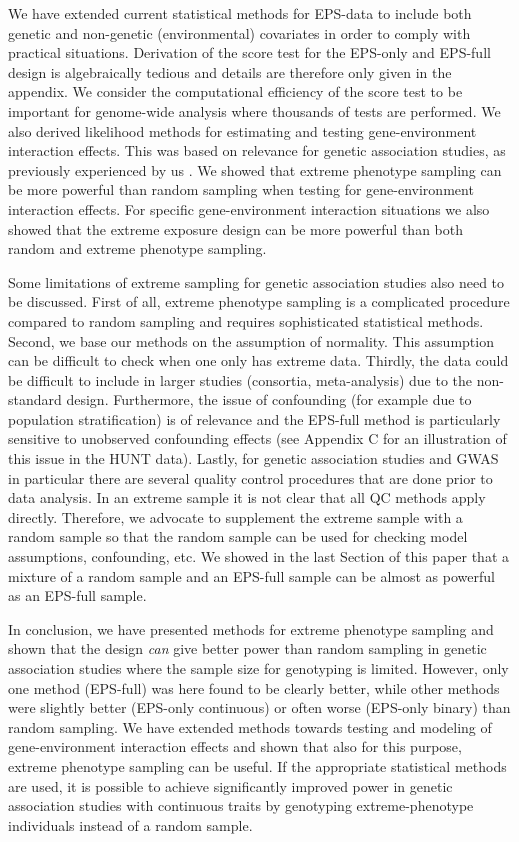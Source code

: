 \documentclass[10pt,a4paper]{article}
\begin{document}
We have extended current statistical methods for EPS-data to include both genetic and non-genetic (environmental) covariates in order to comply with practical situations. Derivation of the score test for the EPS-only and EPS-full design is algebraically tedious and details are therefore only given in the appendix. We consider the computational efficiency of the score test to be important for genome-wide analysis where thousands of tests are performed. We also derived likelihood methods for estimating and testing gene-environment interaction effects. This was based on relevance for genetic association studies, as previously experienced by us \citep{WHRbjornland}. We showed that extreme phenotype sampling can be more powerful than random sampling when testing for gene-environment interaction effects. For specific gene-environment interaction situations we also showed that the extreme exposure design can be more powerful than both random and extreme phenotype sampling.

Some limitations of extreme sampling for genetic association studies also need to be discussed. First of all, extreme phenotype sampling is a complicated procedure compared to random sampling and requires sophisticated statistical methods. Second, we base our methods on the assumption of normality. This assumption can be difficult to check when one only has extreme data. Thirdly, the data could be difficult to include in larger studies (consortia, meta-analysis) due to the non-standard design. Furthermore, the issue of confounding (for example due to population stratification) is of relevance and the EPS-full method is particularly sensitive to unobserved confounding effects (see Appendix C for an illustration of this issue in the HUNT data). Lastly, for genetic association studies and GWAS in particular there are several quality control procedures that are done prior to data analysis. In an extreme sample it is not clear that all QC methods apply directly. Therefore, we advocate to supplement the extreme sample with a random sample so that the random sample can be used for checking model assumptions, confounding, etc. We showed in the last Section of this paper that a mixture of a random sample and an EPS-full sample can be almost as powerful as an EPS-full sample.

In conclusion, we have presented methods for extreme phenotype sampling and shown that the design \textit{can} give better power than random sampling in genetic association studies where the sample size for genotyping is limited. However, only one method (EPS-full) was here found to be clearly better, while other methods were slightly better (EPS-only continuous) or often worse (EPS-only binary) than random sampling. We have extended methods towards testing and modeling of gene-environment interaction effects and shown that also for this purpose, extreme phenotype sampling can be useful. If the appropriate statistical methods are used, it is possible to achieve significantly improved power in genetic association studies with continuous traits by genotyping extreme-phenotype individuals instead of a random sample. 
\end{document}
